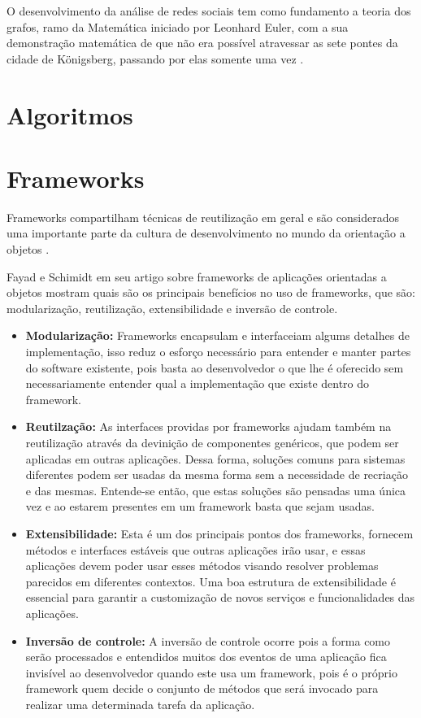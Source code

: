 O desenvolvimento da análise de redes sociais tem como fundamento a teoria dos grafos, ramo da Matemática iniciado por Leonhard Euler, com a sua demonstração matemática de que não era possível atravessar as sete pontes da cidade de Königsberg, passando por elas somente uma vez \cite{Goular:2014}.

\section{Algoritmos}

\section{Frameworks}

Frameworks compartilham técnicas de reutilização em geral e são considerados uma importante parte da cultura de desenvolvimento no mundo da orientação a objetos \cite{Johnson:1997}.

Fayad e Schimidt em seu artigo \cite{Fayad:Schimidt:1997} sobre frameworks de aplicações orientadas a objetos mostram quais são os principais benefícios no uso de frameworks, que são: modularização, reutilização, extensibilidade e inversão de controle.

\begin{itemize}
	\item \textbf{Modularização:} Frameworks encapsulam e interfaceiam algums detalhes de implementação, isso reduz o esforço necessário para entender e manter partes do software existente, pois basta ao desenvolvedor o que lhe é oferecido sem necessariamente entender qual a implementação que existe dentro do framework.

	\item \textbf{Reutilzação:} As interfaces providas por frameworks ajudam também na reutilização através da devinição de componentes genéricos, que podem ser aplicadas em outras aplicações. Dessa forma, soluções comuns para sistemas diferentes podem ser usadas da mesma forma sem a necessidade de recriação e das mesmas. Entende-se então, que estas soluções são pensadas uma única vez e ao estarem presentes em um framework basta que sejam usadas.

	\item \textbf{Extensibilidade:} Esta é um dos principais pontos dos frameworks, fornecem métodos e interfaces estáveis que outras aplicações irão usar, e essas aplicações devem poder usar esses métodos visando resolver problemas parecidos em diferentes contextos. Uma boa estrutura de extensibilidade é essencial para garantir a customização de novos serviços e funcionalidades das aplicações.

	\item \textbf{Inversão de controle:} A inversão de controle ocorre pois a forma como serão processados e entendidos muitos dos eventos de uma aplicação fica invisível ao desenvolvedor quando este usa um framework, pois é o próprio framework quem decide o conjunto de métodos que será invocado para realizar uma determinada tarefa da aplicação.
\end{itemize}

